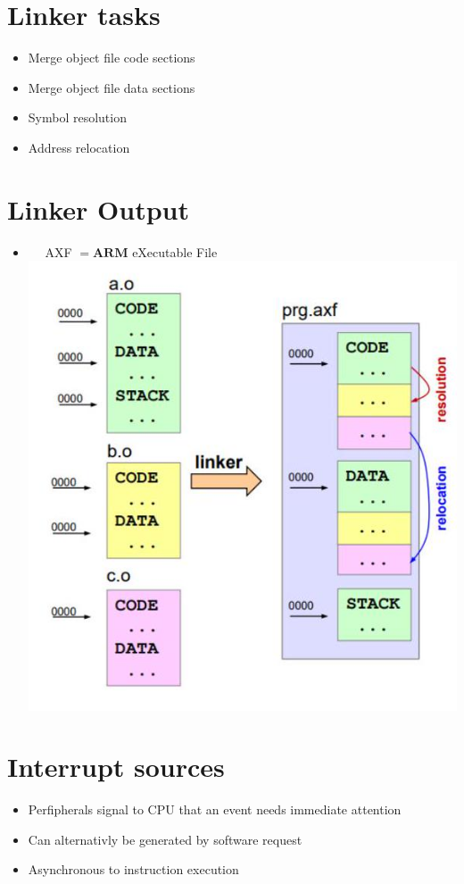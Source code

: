 \documentclass[10pt]{article}
\begin{document}
\section*{Linker tasks}
\begin{itemize}
  \item Merge object file code sections
  \item Merge object file data sections
  \item Symbol resolution
  \item Address relocation
\end{itemize}

\section*{Linker Output}
\begin{itemize}
  \item $\quad$ AXF $=\mathbf{A R M}$ eXecutable File\\
\includegraphics[max width=\textwidth, center]{2024_12_29_79e6b22f503fb7b4f718g-10}
\end{itemize}

\section*{Interrupt sources}
\begin{itemize}
  \item Perfipherals signal to CPU that an event needs immediate attention
  \item Can alternativly be generated by software request
  \item Asynchronous to instruction execution
\end{itemize}
\end{document}
